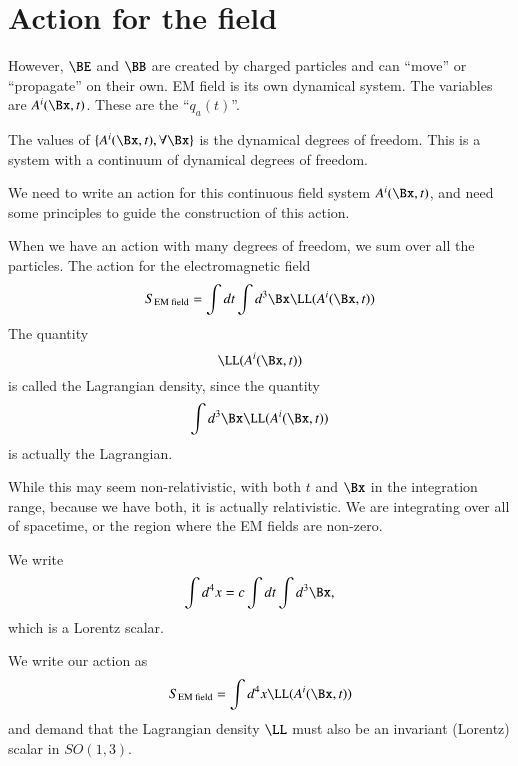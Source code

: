 %
%
\section{Action for the field}

However, \(\BE\) and \(\BB\) are created by charged particles and can ``move'' or ``propagate'' on their own.  EM field is its own dynamical system.  The variables are \(A^i(\Bx, t)\).  These are the ``\(q_a(t)\)''.

The values of \(\{A^i(\Bx, t), \forall \Bx\}\) is the dynamical degrees of freedom.  This is a system with a continuum of dynamical degrees of freedom.

We need to write an action for this continuous field system \(A^i(\Bx,t)\), and need some principles to guide the construction of this action.

When we have an action with many degrees of freedom, we sum over all the particles.  The action for the electromagnetic field
%
\begin{equation}\label{eqn:relativisticElectrodynamicsL12b:90}
S_{\text{EM field}} = \int dt \int d^3\Bx \LL(A^i(\Bx, t))
\end{equation}
%
The quantity
%
\begin{equation}\label{eqn:relativisticElectrodynamicsL12b:110}
\LL(A^i(\Bx, t))
\end{equation}
%
is called the Lagrangian density, since the quantity
%
\begin{equation}\label{eqn:relativisticElectrodynamicsL12b:130}
\int d^3\Bx \LL(A^i(\Bx, t))
\end{equation}
%
is actually the Lagrangian.

While this may seem non-relativistic, with both \(t\) and \(\Bx\) in the integration range, because we have both, it is actually relativistic.  We are integrating over all of spacetime, or the region where the EM fields are non-zero.

We write
%
\begin{equation}\label{eqn:relativisticElectrodynamicsL12b:150}
\int d^4 x  = c \int dt \int d^3 \Bx,
\end{equation}
%
which is a Lorentz scalar.

We write our action as
%
\begin{equation}\label{eqn:relativisticElectrodynamicsL12b:170}
S_{\text{EM field}} = \int d^4 x \LL(A^i(\Bx, t))
\end{equation}
%
and demand that the Lagrangian density \(\LL\) must also be an invariant (Lorentz) scalar in \(SO(1,3)\).
%
